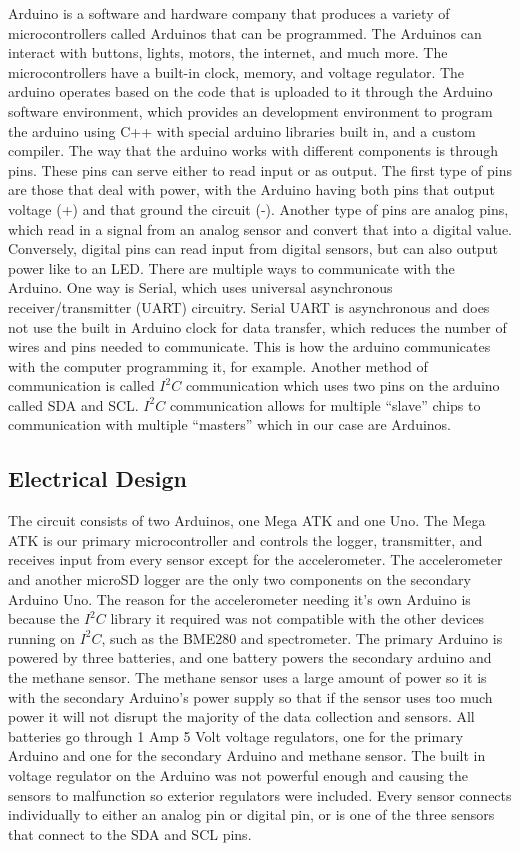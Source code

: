 \documentclass[12pt,]{article}
\begin{document}
Arduino is a software and hardware company that produces a variety of
microcontrollers called Arduinos that can be programmed. The Arduinos
can interact with buttons, lights, motors, the internet, and much more.
The microcontrollers have a built-in clock, memory, and voltage
regulator. The arduino operates based on the code that is uploaded to it
through the Arduino software environment, which provides an development
environment to program the arduino using C++ with special arduino
libraries built in, and a custom compiler. The way that the arduino
works with different components is through pins. These pins can serve
either to read input or as output. The first type of pins are those that
deal with power, with the Arduino having both pins that output voltage
(+) and that ground the circuit (-). Another type of pins are analog
pins, which read in a signal from an analog sensor and convert that into
a digital value. Conversely, digital pins can read input from digital
sensors, but can also output power like to an LED. There are multiple
ways to communicate with the Arduino. One way is Serial, which uses
universal asynchronous receiver/transmitter (UART) circuitry. Serial
UART is asynchronous and does not use the built in Arduino clock for
data transfer, which reduces the number of wires and pins needed to
communicate. This is how the arduino communicates with the computer
programming it, for example. Another method of communication is called
\(I^2C\) communication which uses two pins on the arduino called SDA and
SCL. \(I^2C\) communication allows for multiple ``slave'' chips to
communication with multiple ``masters'' which in our case are Arduinos.

\subsection{Electrical Design}\label{electrical-design}

The circuit consists of two Arduinos, one Mega ATK and one Uno. The Mega
ATK is our primary microcontroller and controls the logger, transmitter,
and receives input from every sensor except for the accelerometer. The
accelerometer and another microSD logger are the only two components on
the secondary Arduino Uno. The reason for the accelerometer needing it's
own Arduino is because the \(I^2C\) library it required was not
compatible with the other devices running on \(I^2C\), such as the
BME280 and spectrometer. The primary Arduino is powered by three
batteries, and one battery powers the secondary arduino and the methane
sensor. The methane sensor uses a large amount of power so it is with
the secondary Arduino's power supply so that if the sensor uses too much
power it will not disrupt the majority of the data collection and
sensors. All batteries go through 1 Amp 5 Volt voltage regulators, one
for the primary Arduino and one for the secondary Arduino and methane
sensor. The built in voltage regulator on the Arduino was not powerful
enough and causing the sensors to malfunction so exterior regulators
were included. Every sensor connects individually to either an analog
pin or digital pin, or is one of the three sensors that connect to the
SDA and SCL pins.
\end{document}
